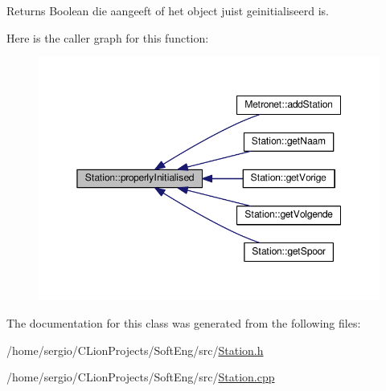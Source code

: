 \begin{DoxyReturn}{Returns}
Boolean die aangeeft of het object juist geinitialiseerd is. 
\end{DoxyReturn}
Here is the caller graph for this function\+:\nopagebreak
\begin{figure}[H]
\begin{center}
\leavevmode
\includegraphics[width=350pt]{class_station_a9ce626dd0599e3ea8107404a59c21e16_icgraph}
\end{center}
\end{figure}


The documentation for this class was generated from the following files\+:\begin{DoxyCompactItemize}
\item 
/home/sergio/\+C\+Lion\+Projects/\+Soft\+Eng/src/\hyperlink{_station_8h}{Station.\+h}\item 
/home/sergio/\+C\+Lion\+Projects/\+Soft\+Eng/src/\hyperlink{_station_8cpp}{Station.\+cpp}\end{DoxyCompactItemize}
